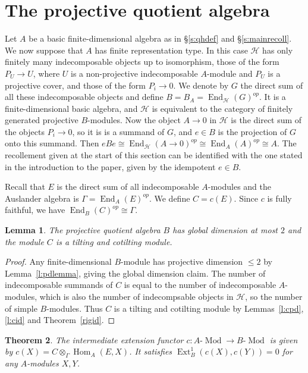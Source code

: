 \documentclass[11pt,a4paper]{amsart}
\theoremstyle{plain}
\newtheorem{thm}{Theorem}[section]
\newtheorem{lem}[thm]{Lemma}
\theoremstyle{definition}
\begin{document}
\section{The projective quotient algebra}
\label{s:pqa}
Let $A$ be a basic finite-dimensional algebra as in \S\ref{s:qhdef} and \S\ref{s:mainrecoll}.
We now suppose that $A$ has finite representation type. In this case ${\mathcal{H}}$ has only finitely many
indecomposable objects up to isomorphism, those of the form $P_U\to U$, where $U$ is a
non-projective indecomposable $A$-module and $P_U$ is a projective cover, and those of the form $P_i\to 0$. 
We denote by $G$ the direct sum of all these indecomposable objects
and define $B = B_A = \operatorname{End}_{\mathcal{H}}(G)^{op}$. It is a finite-dimensional basic algebra,
and ${\mathcal{H}}$ is equivalent to the category of finitely generated projective $B$-modules.
Now the object $A\to 0$ in ${\mathcal{H}}$ is the direct sum of the objects 
$P_i \to 0$, so it is is a summand of $G$,
and $e\in B$ is the projection of $G$ onto this summand.
Then $eB e \cong \operatorname{End}_{\mathcal{H}}(A\to 0)^{op} \cong \operatorname{End}_A(A)^{op} \cong A$.
The recollement given at the start of this section can be identified with
the one stated in the introduction to the paper, given by the idempotent $e\in B$.

Recall that $E$ is the direct sum of all indecomposable $A$-modules and the
Auslander algebra is $\Gamma = \operatorname{End}_A(E)^{op}$. 
We define $C=c(E)$. Since $c$ is fully faithful, we have $\operatorname{End}_B(C)^{op} \cong \Gamma$.

\begin{lem} 
\label{gldim2}
The projective quotient algebra $B$ has global dimension at most $2$
and the module $C$ is a tilting and cotilting module.
\end{lem}

\begin{proof}
Any finite-dimensional $B$-module has projective dimension $\le 2$ by
Lemma~\ref{l:pdlemma}, giving the global dimension claim.
The number of indecomposable summands of $C$ is equal to the number of
indecomposable $A$-modules, which is also the number of indecompsable objects in ${\mathcal{H}}$,
so the number of simple $B$-modules. Thus
$C$ is a tilting and cotilting module by Lemmas~\ref{l:cpd}, \ref{l:cid} and Theorem~\ref{rigid}.
\end{proof}

\begin{thm}
\label{t:cformula}
The intermediate extension functor $c:\text{$A$-$\operatorname{Mod}$} \to \text{$B$-$\operatorname{Mod}$}$
is given by $c(X) = C \otimes_\Gamma \operatorname{Hom}_A(E,X)$.
It satisfies $\operatorname{Ext}^1_B(c(X),c(Y)) = 0$ for any $A$-modules $X,Y$.
\end{thm}
\end{document}
